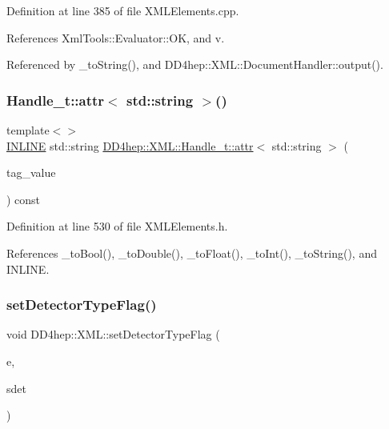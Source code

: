 Definition at line 385 of file X\+M\+L\+Elements.\+cpp.



References Xml\+Tools\+::\+Evaluator\+::\+OK, and v.



Referenced by \+\_\+to\+String(), and D\+D4hep\+::\+X\+M\+L\+::\+Document\+Handler\+::output().

\hypertarget{namespace_d_d4hep_1_1_x_m_l_a7802046fcd22f2477a0b2ef7aaf10f0a}{}\label{namespace_d_d4hep_1_1_x_m_l_a7802046fcd22f2477a0b2ef7aaf10f0a} 
\subsubsection{\texorpdfstring{Handle\+\_\+t\+::attr$<$ std\+::string $>$()}{Handle\_t::attr< std::string >()}}
{\footnotesize\ttfamily template$<$$>$ \\
\hyperlink{_x_m_l_elements_8h_a2eb6f9e0395b47b8d5e3eeae4fe0c116}{I\+N\+L\+I\+NE} std\+::string \hyperlink{class_d_d4hep_1_1_x_m_l_1_1_handle__t_a5b116e138ee498803385f9ec503395c3}{D\+D4hep\+::\+X\+M\+L\+::\+Handle\+\_\+t\+::attr}$<$ std\+::string $>$ (\begin{DoxyParamCaption}\item[{const \hyperlink{namespace_d_d4hep_1_1_x_m_l_a09e5d9cc86ed782f6826dfe0778c1815}{Xml\+Char} $\ast$}]{tag\+\_\+value }\end{DoxyParamCaption}) const}



Definition at line 530 of file X\+M\+L\+Elements.\+h.



References \+\_\+to\+Bool(), \+\_\+to\+Double(), \+\_\+to\+Float(), \+\_\+to\+Int(), \+\_\+to\+String(), and I\+N\+L\+I\+NE.

\hypertarget{namespace_d_d4hep_1_1_x_m_l_ae5c379820b07798a4c0af10b83fd2ad0}{}\label{namespace_d_d4hep_1_1_x_m_l_ae5c379820b07798a4c0af10b83fd2ad0} 
\subsubsection{\texorpdfstring{set\+Detector\+Type\+Flag()}{setDetectorTypeFlag()}}
{\footnotesize\ttfamily void D\+D4hep\+::\+X\+M\+L\+::set\+Detector\+Type\+Flag (\begin{DoxyParamCaption}\item[{\hyperlink{class_d_d4hep_1_1_x_m_l_1_1_handle__t}{D\+D4hep\+::\+X\+M\+L\+::\+Handle\+\_\+t}}]{e,  }\item[{\hyperlink{class_d_d4hep_1_1_geometry_1_1_det_element}{D\+D4hep\+::\+Geometry\+::\+Det\+Element}}]{sdet }\end{DoxyParamCaption})}

